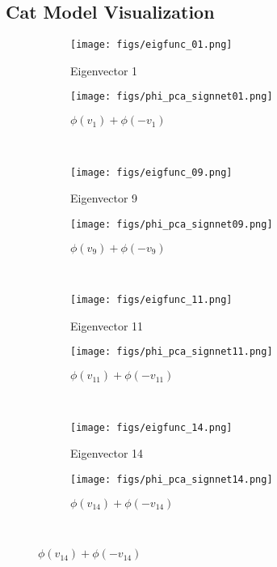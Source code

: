 \documentclass{article} \usepackage{iclr2023_conference,times}
\begin{document}
\subsection{Cat Model Visualization}\label{appendix:cat_viz}

\begin{figure}[ht]
    \captionsetup[subfigure]{labelformat=empty}
    \centering
    \newcommand{\wth}{.45}
    
    \begin{subfigure}{.4\columnwidth}
    \centering
    \texttt{[image: figs/eigfunc\_01.png]}
    \caption{Eigenvector 1}
    \end{subfigure} 
    \begin{subfigure}{.4\columnwidth}
    \centering
    \texttt{[image: figs/phi\_pca\_signnet01.png]}
    \caption{$\phi(v_1) + \phi(-v_1)$}
    \end{subfigure} \\[5pt]
    
    \begin{subfigure}{.4\columnwidth}
    \centering
    \texttt{[image: figs/eigfunc\_09.png]}
    \caption{Eigenvector 9}
    \end{subfigure} 
    \begin{subfigure}{.4\columnwidth}
    \centering
    \texttt{[image: figs/phi\_pca\_signnet09.png]}
    \caption{$\phi(v_9) + \phi(-v_9)$}
    \end{subfigure} \\[5pt]
    
    \begin{subfigure}{.4\columnwidth}
    \centering
    \texttt{[image: figs/eigfunc\_11.png]}
    \caption{Eigenvector 11}
    \end{subfigure} 
    \begin{subfigure}{.4\columnwidth}
    \centering
    \texttt{[image: figs/phi\_pca\_signnet11.png]}
    \caption{$\phi(v_{11}) + \phi(-v_{11})$}
    \end{subfigure} \\[5pt]
    
    \begin{subfigure}{.4\columnwidth}
    \centering
    \texttt{[image: figs/eigfunc\_14.png]}
    \caption{Eigenvector 14}
    \end{subfigure} 
    \begin{subfigure}{.4\columnwidth}
    \centering
    \texttt{[image: figs/phi\_pca\_signnet14.png]}
    \caption{$\phi(v_{14}) + \phi(-v_{14})$}
    \end{subfigure} \\[5pt]
    

\end{figure}
\end{document}
